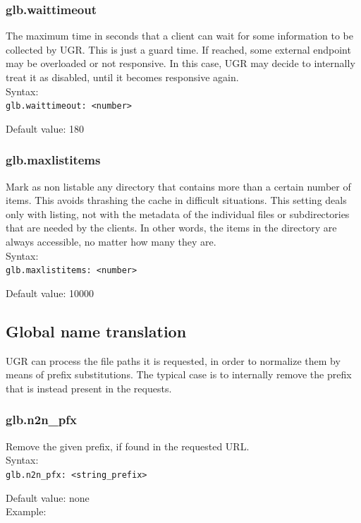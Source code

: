 \documentclass[12pt]{article} %
\begin{document}
\subsubsection{glb.waittimeout}

The maximum time in seconds that a client can wait for some information to be collected by UGR. This is just a guard time. If reached, some external endpoint may be overloaded or not responsive. In this case, UGR may decide to internally treat it as disabled, until it becomes responsive again.
\\
Syntax:\\
\verb"glb.waittimeout: <number>"

Default value: 180

\subsubsection{glb.maxlistitems}
Mark as non listable any directory that contains more than a certain number of items. This avoids thrashing the cache in difficult situations. This setting deals only with listing, not with the metadata of the individual files or subdirectories that are needed by the clients. In other words, the items in the directory are always accessible, no matter how many they are.\\
Syntax:\\
\verb"glb.maxlistitems: <number>"


Default value: 10000



\subsection{Global name translation}

UGR can process the file paths it is requested, in order to normalize them by means of prefix substitutions. The typical case is to internally remove the prefix that is instead present in the requests.

\subsubsection{glb.n2n\_pfx}

Remove the given prefix, if found in the requested URL.\\
Syntax:\\
\verb"glb.n2n_pfx: <string_prefix>"

Default value: none
\\
Example:\\
\end{document}
